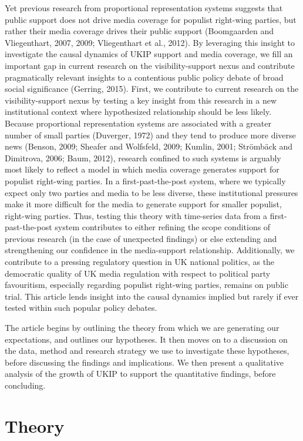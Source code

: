 \documentclass[12pt,article]{article}
\begin{document}
Yet previous research from proportional representation systems suggests
that public support does not drive media coverage for populist
right-wing parties, but rather their media coverage drives their public
support (Boomgaarden and Vliegenthart, 2007, 2009; Vliegenthart et al.,
2012). By leveraging this insight to investigate the causal dynamics of
UKIP support and media coverage, we fill an important gap in current
research on the visibility-support nexus and contribute pragmatically
relevant insights to a contentious public policy debate of broad social
significance (Gerring, 2015). First, we contribute to current research
on the visibility-support nexus by testing a key insight from this
research in a new institutional context where hypothesized relationship
should be less likely. Because proportional representation systems are
associated with a greater number of small parties (Duverger, 1972) and
they tend to produce more diverse news (Benson, 2009; Sheafer and
Wolfsfeld, 2009; Kumlin, 2001; Strömbäck and Dimitrova, 2006; Baum,
2012), research confined to such systems is arguably most likely to
reflect a model in which media coverage generates support for populist
right-wing parties. In a first-past-the-post system, where we typically
expect only two parties and media to be less diverse, these
institutional pressures make it more difficult for the media to generate
support for smaller populist, right-wing parties. Thus, testing this
theory with time-series data from a first-past-the-post system
contributes to either refining the scope conditions of previous research
(in the case of unexpected findings) or else extending and strengthening
our confidence in the media-support relationship. Additionally, we
contribute to a pressing regulatory question in UK national politics, as
the democratic quality of UK media regulation with respect to political
party favouritism, especially regarding populist right-wing parties,
remains on public trial. This article lends insight into the causal
dynamics implied but rarely if ever tested within such popular policy
debates.

The article begins by outlining the theory from which we are generating
our expectations, and outlines our hypotheses. It then moves on to a
discussion on the data, method and research strategy we use to
investigate these hypotheses, before discussing the findings and
implications. We then present a qualitative analysis of the growth of
UKIP to support the quantitative findings, before concluding.

\section{Theory}\label{theory}
\end{document}
